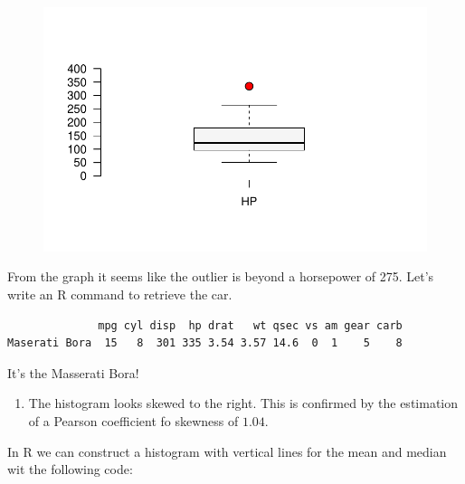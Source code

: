 \documentclass[
  letterpaper,
  DIV=11,
  numbers=noendperiod]{scrreprt}
\newenvironment{Shaded}{\begin{snugshade}}{\end{snugshade}}
\newcommand{\DecValTok}[1]{\textcolor[rgb]{0.68,0.00,0.00}{#1}}
\newcommand{\NormalTok}[1]{\textcolor[rgb]{0.00,0.23,0.31}{#1}}
\newcommand{\SpecialCharTok}[1]{\textcolor[rgb]{0.37,0.37,0.37}{#1}}
\providecommand{\tightlist}{%
  \setlength{\itemsep}{0pt}\setlength{\parskip}{0pt}}\usepackage{longtable,booktabs,array}
\begin{document}
\begin{figure}[H]

{\centering \includegraphics{./06-DescriptiveV_files/figure-pdf/unnamed-chunk-9-1.pdf}

}

\end{figure}

From the graph it seems like the outlier is beyond a horsepower of 275.
Let's write an R command to retrieve the car.

\begin{Shaded}
\end{Shaded}

\begin{verbatim}
              mpg cyl disp  hp drat   wt qsec vs am gear carb
Maserati Bora  15   8  301 335 3.54 3.57 14.6  0  1    5    8
\end{verbatim}

It's the Masserati Bora!

\begin{enumerate}
\def\labelenumi{\arabic{enumi}.}
\setcounter{enumi}{1}
\tightlist
\item
  The histogram looks skewed to the right. This is confirmed by the
  estimation of a Pearson coefficient fo skewness of \(1.04\).
\end{enumerate}

In R we can construct a histogram with vertical lines for the mean and
median wit the following code:
\end{document}
